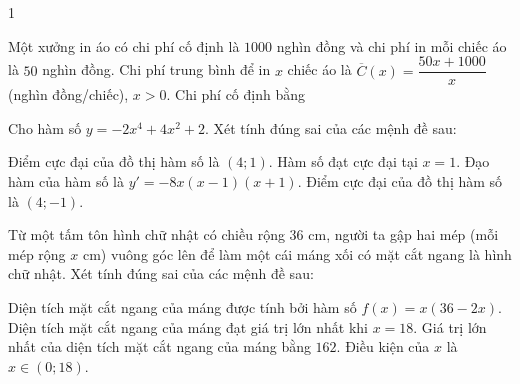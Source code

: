 \begin{deontap}{1}
\begin{cau}
\end{cau}
\begin{cau}Một xưởng in áo có chi phí cố định là $1000$ nghìn đồng và chi phí in mỗi chiếc áo là $50$ nghìn đồng. Chi phí trung bình để in $x$ chiếc áo là $\overline{C}(x)=\dfrac{50x+1000}{x}$ (nghìn đồng/chiếc), $x>0$. Chi phí cố định bằng
\end{cau}
\phanII
\begin{cau}Cho hàm số $y=-2x^{4}+4x^{2}+2$. Xét tính đúng sai của các mệnh đề sau:
\begin{dungsai}
  \y Điểm cực đại của đồ thị hàm số là $(4;1)$. \oDS
  \y Hàm số đạt cực đại tại $x=1$. \oDS
  \y Đạo hàm của hàm số là $y'=- 8 x (x - 1) (x + 1)$. \oDS
  \y Điểm cực đại của đồ thị hàm số là $(4;-1)$. \oDS
\end{dungsai}
\end{cau}
\begin{cau}Từ một tấm tôn hình chữ nhật có chiều rộng $36$ cm, người ta gập hai mép (mỗi mép rộng $x$ cm) vuông góc lên để làm một cái máng xối có mặt cắt ngang là hình chữ nhật. Xét tính đúng sai của các mệnh đề sau:
\begin{dungsai}
  \y Diện tích mặt cắt ngang của máng được tính bởi hàm số $f(x)=x(36-2x)$. \oDS
  \y Diện tích mặt cắt ngang của máng đạt giá trị lớn nhất khi $x=18$. \oDS
  \y Giá trị lớn nhất của diện tích mặt cắt ngang của máng bằng $162$. \oDS
  \y Điều kiện của $x$ là $x\in(0;18)$. \oDS
\end{dungsai}
\end{cau}

\end{deontap}
